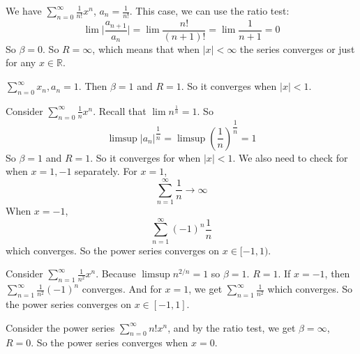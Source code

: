 \documentclass{report}
\begin{document}
\begin{examples}
    \begin{example}
        We have $\sum_{n = 0}^{\infty}\frac{1}{n!}x^{n}$, $a_{n} = \frac{1}{n!}$. This case, we can use the ratio test:
            \begin{equation*}
                \lim \lvert \dfrac{a_{n + 1}}{a_{n}} \rvert =  \lim \dfrac{n!}{(n + 1)!} = \lim \dfrac{1}{n + 1} = 0
            \end{equation*}
        So $\beta = 0$. So $R = \infty$, which means that when $\lvert x \rvert < \infty$ the series converges or just for any $x \in \mathbb{R}$.
    \end{example}
    \begin{example}
        $\sum_{n = 0}^{ \infty} x_{n}, a_{n} = 1$. Then $\beta = 1$ and $R = 1$. So it converges when $\lvert x \rvert < 1$.
    \end{example}
    \begin{example}
        Consider $\sum_{n = 0}^{\infty}\frac{1}{n}x^{n}$. Recall that $\lim n^{\frac{1}{n}} = 1$. So
            \begin{equation*}
                \limsup \lvert a_{n} \rvert^{\dfrac{1}{n}} = \limsup \left(\dfrac{1}{n}\right)^{\dfrac{1}{n}} = 1
            \end{equation*}
        So $\beta = 1$ and $R = 1$. So it converges for when $\lvert x \rvert <1$. We also need to check for when $x = 1, -1$ separately. For $x = 1$,
            \begin{equation*}
                \sum_{n = 1}^{\infty}\dfrac{1}{n} \rightarrow \infty
            \end{equation*}
        When $x = -1$,
            \begin{equation*}
                \sum_{n = 1}^{\infty}(-1)^{n}\dfrac{1}{n}
            \end{equation*}
        which converges. So the power series converges on $x \in [-1, 1)$.
    \end{example}
    \begin{example}
        Consider $\sum_{n = 1}^{\infty}\frac{1}{n^{2}}x^{n}$. Because $\limsup n^{2/n} = 1$ so $\beta = 1$. $R = 1$. If $x = -1$, then $\sum_{n = 1}^{\infty}\frac{1}{n^{2}}(-1)^{n}$ converges. And for $x = 1$, we get $\sum_{n = 1}^{\infty}\frac{1}{n^{2}}$ which converges. So the power series converges on $x \in [-1, 1]$.
    \end{example}
    \begin{example}
        Consider the power series $\sum_{n = 0}^{\infty} n! x^{n}$, and by the ratio test, we get $\beta = \infty$, $R = 0$. So the power series converges when $x = 0$.
    \end{example}
\end{examples}
\end{document}
